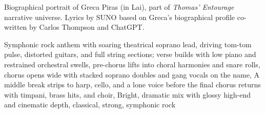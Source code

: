 
\begin{notes}
Biographical portrait of Greca Piras (in Lai), part of \emph{Thomas’ Entourage} narrative universe. Lyrics by SUNO based on Greca's biographical profile co-written by Carlos Thompson and ChatGPT.
\end{notes}
\begin{style}
Symphonic rock anthem with soaring theatrical soprano lead, driving tom-tom pulse, distorted guitars, and full string sections; verse builds with low piano and restrained orchestral swells, pre-chorus lifts into choral harmonies and snare rolls, chorus opens wide with stacked soprano doubles and gang vocals on the name, A middle break strips to harp, cello, and a lone voice before the final chorus returns with timpani, brass hits, and choir, Bright, dramatic mix with glossy high-end and cinematic depth, classical, strong, symphonic rock
\end{style}
